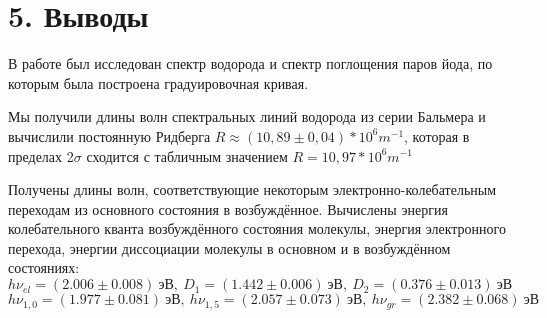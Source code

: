 \documentclass[a4paper,12pt]{report}
\begin{document}
\section*{5. Выводы}
В работе был исследован спектр водорода и спектр поглощения паров йода, по которым была построена градуировочная кривая.

Мы получили длины волн спектральных линий водорода из серии Бальмера и вычислили постоянную Ридберга $R \approx (10,89 \pm 0,04) * 10^{6} m^{-1}$, которая в пределах 2$\sigma$ сходится с табличным значением $R =  10,97 * 10^{6} m^{-1}$

Получены длины волн, соответствующие некоторым электронно-колебательным переходам из основного состояния в возбуждённое. Вычислены энергия колебательного кванта возбуждённого состояния молекулы, энергия электронного перехода, энергии диссоциации молекулы в основном и в возбуждённом состояниях:
\[\boxed{h\nu_{el}=(2.006\pm 0.008) \ \text{эВ}, \ D_1=(1.442\pm 0.006)\  \text{эВ}, \  D_2=(0.376 \pm 0.013) \ \text{эВ}}\]
\[\boxed{h\nu_{1,0}=(1.977\pm 0.081) \ \text{эВ},\ h\nu_{1,5}=(2.057\pm 0.073) \ \text{эВ},\ h\nu_{gr}=(2.382\pm 0.068) \ \text{эВ}}\]
\end{document}
